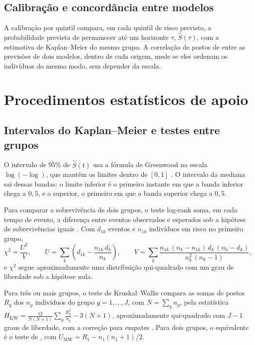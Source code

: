     \subsection{Calibração e concordância entre modelos}
    \label{subsec:calibracao_concordancia}

A calibração por quintil compara, em cada quintil de risco previsto, a probabilidade prevista de permanecer até um horizonte $\tau$, $\hat{S}(\tau)$, com a estimativa de Kaplan--Meier do mesmo grupo. A correlação de postos de \citet{spearman1904} entre as previsões de dois modelos, dentro de cada origem, mede se eles ordenam os indivíduos do mesmo modo, sem depender da escala.

\section{Procedimentos estatísticos de apoio}
\label{sec:procedimentos_apoio}

    \subsection{Intervalos do Kaplan--Meier e testes entre grupos}
    \label{subsec:ic_km}
    \label{subsec:testes_grupos}

O intervalo de 95\% de $\hat{S}(t)$ usa a fórmula de Greenwood na escala $\log(-\log)$, que mantém os limites dentro de $[0, 1]$ \citep{harrell2001}. O intervalo da mediana sai dessas bandas: o limite inferior é o primeiro instante em que a banda inferior chega a $0{,}5$, e o superior, o primeiro em que a banda superior chega a $0{,}5$.

Para comparar a sobrevivência de dois grupos, o teste log-rank soma, em cada tempo de evento, a diferença entre eventos observados e esperados sob a hipótese de sobrevivências iguais \citep{kleinbaum2012}. Com $d_{1k}$ eventos e $n_{1k}$ indivíduos em risco no primeiro grupo,
\begin{equation}
    \chi^2 = \frac{U^2}{V},
    \qquad
    U = \sum_{k} \left(d_{1k} - \frac{n_{1k}\, d_k}{n_k}\right),
    \qquad
    V = \sum_{k} \frac{n_{1k}\,(n_k - n_{1k})\,d_k\,(n_k - d_k)}{n_k^{2}\,(n_k - 1)},
    \label{eq:logrank}
\end{equation}
e $\chi^2$ segue aproximadamente uma distribuição qui-quadrado com um grau de liberdade sob a hipótese nula.

Para três ou mais grupos, o teste de Kruskal--Wallis compara as somas de postos $R_g$ dos $n_g$ indivíduos do grupo $g = 1, \ldots, J$, com $N = \sum_g n_g$, pela estatística $H_{\mathrm{KW}} = \frac{12}{N(N+1)}\sum_{g} \frac{R_g^2}{n_g} - 3(N+1)$, aproximadamente qui-quadrado com $J-1$ graus de liberdade, com a correção para empates \citep{kruskal1952}. Para dois grupos, o equivalente é o teste de \citet{mann1947}, com $U_{\mathrm{MW}} = R_1 - n_1(n_1+1)/2$.

